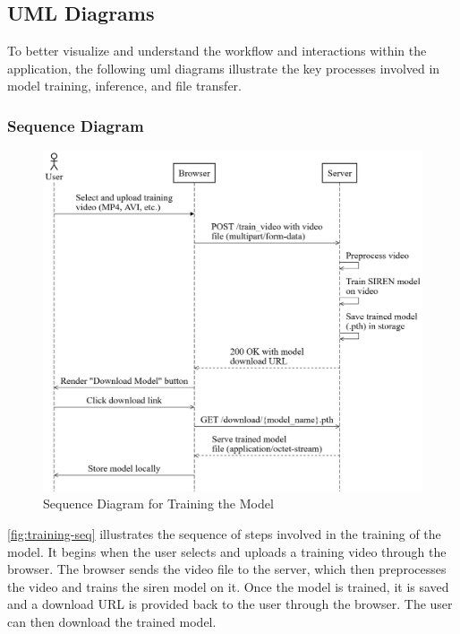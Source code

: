 \pagebreak
\subsection{UML Diagrams}
To better visualize and understand the workflow and interactions within the application, the following \gls{uml} diagrams illustrate the key processes involved in model training, inference, and file transfer.
\subsubsection{Sequence Diagram}
\begin{figure}[H]
    \centering
    \includegraphics[width=\linewidth]{assets/website/training_seq.png}
    \caption{Sequence Diagram for Training the Model}
    \label{fig:training-seq}
\end{figure}
\autoref{fig:training-seq} illustrates the sequence of steps involved in the training of the model. It begins when the user selects and uploads a training video through the browser. The browser sends the video file to the server, which then preprocesses the video and trains the \gls{siren} model on it. Once the model is trained, it is saved and a download URL is provided back to the user through the browser. The user can then download the trained model.

